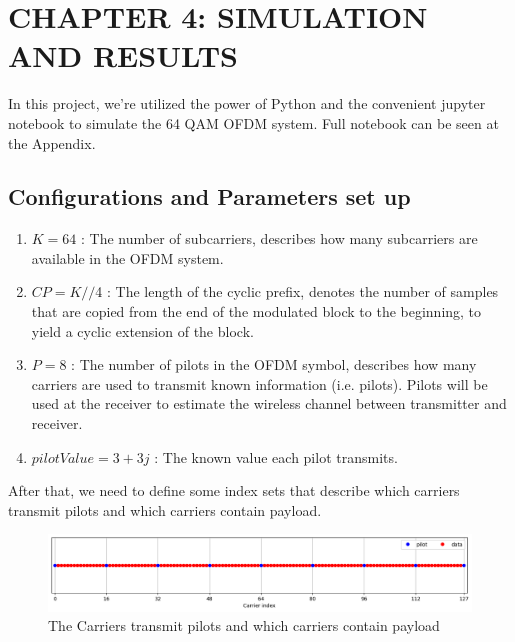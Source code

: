 \section*{CHAPTER 4: SIMULATION AND RESULTS}
\setcounter{section}{4}
\setcounter{subsection}{0}
\setcounter{figure}{0}
\setcounter{table}{0}

In this project, we're utilized the power of Python and the convenient jupyter notebook to simulate the 64 QAM OFDM system. Full notebook can be seen at the Appendix.

\subsection{Configurations and Parameters set up}

\begin{enumerate}
    \item $K = 64$ : The number of subcarriers, describes how many subcarriers are available in the OFDM system.
    \item $CP = K//$4 : The length of the cyclic prefix, denotes the number of samples that are copied from the end of the modulated block to the beginning, to yield a cyclic extension of the block.
    \item $P = 8$ : The number of pilots in the OFDM symbol, describes how many carriers are used to transmit known information (i.e. pilots). Pilots will be used at the receiver to estimate the wireless channel between transmitter and receiver.
    \item $pilotValue = 3+3j$ : The known value each pilot transmits.
\end{enumerate}

After that, we need to define some index sets that describe which carriers transmit pilots and which carriers contain payload.

\begin{figure}[htbp]
    \centering
    \includegraphics[width=\linewidth]{../Source/results/carrier_index}
    \caption{The Carriers transmit pilots and which carriers contain payload}
    \label{carrier_index}
\end{figure}


